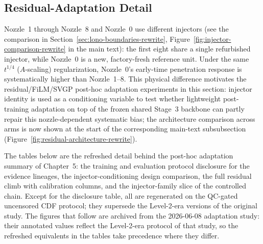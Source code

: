 \FloatBarrier

\subsection{Residual-Adaptation Detail}

Nozzle~1 through Nozzle~8 and Nozzle~0 use different injectors (see the
comparison in Section~\ref{sec:lono-boundaries-rewrite}, Figure~\ref{fig:injector-comparison-rewrite}
in the main text): the first eight share a single refurbished injector, while
Nozzle~0 is a new, factory-fresh reference unit. Under the same \(t^{1/4}\)
(\(A\)-scaling) regularization, Nozzle~0's early-time penetration response is
systematically higher than Nozzle~1--8. This physical difference motivates
the residual/FiLM/SVGP post-hoc adaptation experiments in this section:
injector identity is used as a conditioning variable to test whether
lightweight post-training adaptation on top of the frozen shared Stage~3
backbone can partly repair this nozzle-dependent systematic bias; the
architecture comparison across arms is now shown at the start of the
corresponding main-text subsubsection (Figure~\ref{fig:residual-architecture-rewrite}).

The tables below are the refreshed detail behind the post-hoc adaptation
summary of Chapter~5: the training and evaluation protocol disclosure for the
evidence lineages, the injector-conditioning design comparison, the full
residual climb with calibration columns, and the injector-family slice of the
controlled chain. Except for the disclosure table, all are regenerated on the
QC-gated uncensored CDF protocol; they supersede the Level-2-era versions of
the original study. The figures that follow are archived from the 2026-06-08
adaptation study: their annotated values reflect the Level-2-era protocol of
that study, so the refreshed equivalents in the tables take precedence where
they differ.


